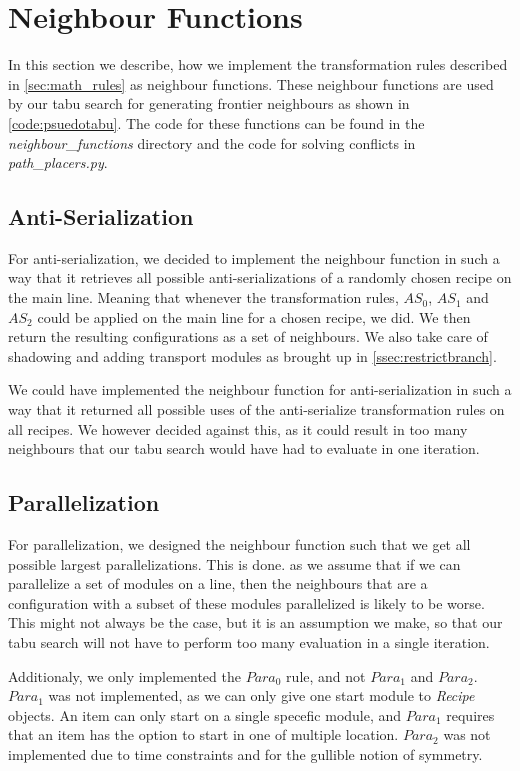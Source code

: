 \section{Neighbour Functions}
In this section we describe, how we implement the transformation rules described in \cref{sec:math_rules} as neighbour functions. These neighbour functions are used by our tabu search for generating frontier neighbours as shown in \cref{code:psuedotabu}. The code for these functions can be found in the \textit{neighbour\_functions} directory and the code for solving conflicts in \textit{path\_placers.py}.


\subsection{Anti-Serialization}
For anti-serialization, we decided to implement the neighbour function in such a way that it retrieves all possible anti-serializations of a randomly chosen recipe on the main line. Meaning that whenever the transformation rules, $AS_0$, $AS_1$ and $AS_2$ could be applied on the main line for a chosen recipe, we did. We then return the resulting configurations as a set of neighbours. We also take care of shadowing and adding transport modules as brought up in \cref{ssec:restrictbranch}.

We could have implemented the neighbour function for anti-serialization in such a way that it returned all possible uses of the anti-serialize transformation rules on all recipes. We however decided against this, as it could result in too many neighbours that our tabu search would have had to evaluate in one iteration.


\subsection{Parallelization}
For parallelization, we designed the neighbour function such that we get all possible largest parallelizations. This is done. as we assume that if we can parallelize a set of modules on a line, then the neighbours that are a configuration with a subset of these modules parallelized is likely to be worse. This might not always be the case, but it is an assumption we make, so that our tabu search will not have to perform too many evaluation in a single iteration. 

Additionaly, we only implemented the $Para_0$ rule, and not $Para_1$ and $Para_2$. $Para_1$ was not implemented, as we can only give one start module to \textit{Recipe} objects. An item can only start on a single specefic module, and $Para_1$ requires that an item has the option to start in one of multiple location. $Para_2$ was not implemented due to time constraints and for the gullible notion of symmetry.


